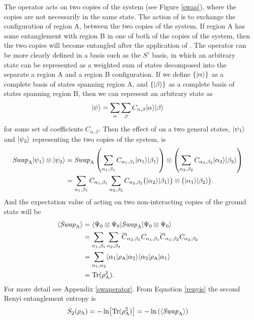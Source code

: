 The \swa operator acts on two copies of the system (see Figure \ref{swap}), where the copies are not necessarily in the same state.  The action of \swa is to exchange the configuration of region A, between the two copies of the system.  If region A has some entanglement with region B in one of both of the copies of the system, then the two copies will become entangled after the application of \swA.
The \swa operator can be more clearly defined in a basis such as the $S^z$ basis, in which an arbitrary state can be represented as a weighted sum of states decomposed into the separate a region A and a region B configuration.  
If we define $\{\lvert {\alpha} \rangle\}$ as a complete basis of states spanning region A, and $\{\lvert {\beta} \rangle\}$ as a complete basis of states spanning region B, then we can represent an arbitrary state as
\begin{equation}
	\lvert {\psi} \rangle = \sum_{\alpha}\sum_{\beta} C_{\alpha,\beta}\lvert {\alpha} \rangle\lvert {\beta} \rangle
\end{equation}
for some set of coefficients $C_{\alpha,\beta}$.  
Then the effect of \swa on a two general states, $\lvert {\psi_1} \rangle$ and $\lvert {\psi_2} \rangle$ representing the two copies of the system, is
\begin{align}
	{\it Swap}_{\rm A} \lvert {\psi_1} \rangle \otimes \lvert {\psi_2} \rangle  &= 
		{\it Swap}_{\rm A} \left(\sum_{\alpha_1,\beta_1} 
		C_{\alpha_1,\beta_1}\lvert {\alpha_1} \rangle\lvert {\beta_1} \rangle\right) \otimes
			\left(\sum_{\alpha_2,\beta_2} 
		C_{\alpha_2,\beta_2}\lvert {\alpha_2} \rangle\lvert {\beta_2} \rangle\right) \\
			&=\sum_{\alpha_1,\beta_1}C_{\alpha_1,\beta_1}\sum_{\alpha_2,\beta_2} 
			C_{\alpha_2,\beta_2}
			\big(\lvert {\alpha_2} \rangle\lvert {\beta_1} \rangle\big)\otimes\big(\lvert {\alpha_1} \rangle\lvert {\beta_2} \rangle\big).
\end{align}
And the expectation value of \swa acting on two non-interacting copies of the ground state will be
\begin{align}
\langle {\it Swap}_{\rm A} \rangle &=
\langle {\Psi_0\otimes\Psi_0} \rvert{\it Swap}_{\rm A} \lvert {\Psi_0\otimes\Psi_0} \rangle \\ 
	&=\sum_{\alpha_1,\beta_1} \sum_{\alpha_2,\beta_2}
		\overline{C}_{\alpha_2,\beta_1}C_{\alpha_1,\beta_1}
		\overline{C}_{\alpha_1,\beta_2}C_{\alpha_2,\beta_2}\\
	&=\sum_{\alpha_1,\alpha_2} \langle {\alpha_1} \rvert\rho_{\rm A} \lvert {\alpha_2} \rangle 
					\langle {\alpha_2} \rvert\rho_{\rm A} \lvert {\alpha_1} \rangle\\
	&={\rm Tr (\rho_A^2)}.
\end{align}
For more detail see Appendix \ref{swaperator}.  From Equation \eqref{renyis} the second Renyi entanglement entropy is
\begin{equation}
	S_2(\rho_{\rm A}) = -\ln\!\left[{\rm Tr}(\rho_{\rm A}^2)\right] = -\ln\left( \langle {\it Swap}_{\rm A} \rangle \right)
\end{equation}


